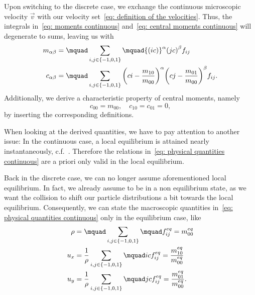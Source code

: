 Upon switching to the discrete case, we exchange the continuous microscopic velocity $\vec{v}$ with our velocity set~\eqref{eq: definition of the velocities}.
Thus, the integrals in~\eqref{eq: moments continuous} and~\eqref{eq: central moments continuous} will degenerate to sums, leaving us with
\begin{align}
  m_{\alpha\beta} &= \mquad\sum_{i,j \in \{-1,0,1\}}\mquad {(ic)}^\alpha {(jc)}^\beta f_{ij}
  \label{eq: moment definition}\\
  c_{\alpha\beta} &= \mquad\sum_{i,j \in \{-1,0,1\}}
  {\left(ci - \frac{m_{10}}{m_{00}}\right)}^\alpha
  {\left(cj - \frac{m_{01}}{m_{00}}\right)}^\beta f_{ij}.
  \label{eq: central moment definition}
\end{align}
Additionally, we derive a characteristic property of central moments, namely
\begin{equation}
  \label{eq: low central moments}
  c_{00}=m_{00},\quad c_{10} = c_{01}=0,
\end{equation}
by inserting the corresponding definitions.

When looking at the derived quantities, we have to pay attention to another issue:
In the continuous case, a local equilibrium is attained nearly instantaneously, c.f.~\cite[page 218]{smits2000physical}.
Therefore the relations in~\eqref{eq: physical quantities continuous} are a priori only valid in the local equilibrium.

Back in the discrete case, we can no longer assume aforementioned local equilibrium.
In fact, we already assume to be in a non equilibrium state, as we want the collision to shift our particle distributions a bit towards the local equilibrium.
Consequently, we can state the macroscopic quantities in~\eqref{eq: physical quantities continuous} only in the equilibrium case, like
\begin{align*}
  \rho & = \mquad\sum_{i,j \in \{-1,0,1\}}\mquad f_{ij}^{eq} = m_{00}^{eq}
  \\
  u_x  & = \frac{1}{\rho} \sum_{i,j \in \{-1,0,1\}}\mquad ic f_{ij}^{eq} = \frac{m_{10}^{eq}}{m_{00}^{eq}}
  \\
  u_y  & = \frac{1}{\rho} \sum_{i,j \in \{-1,0,1\}}\mquad jc f_{ij}^{eq} = \frac{m_{01}^{eq}}{m_{00}^{eq}}.
\end{align*}

